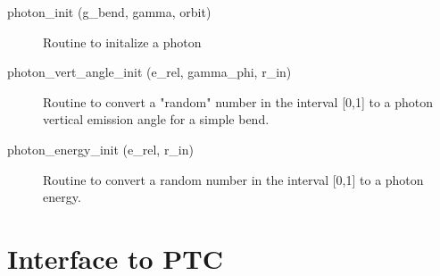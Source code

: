 \begin{description}

\label{r:photon.init}
\item[photon_init (g_bend, gamma, orbit)] \Newline 
Routine to initalize a photon

\label{r:photon.vert.angle.init}
\item[photon_vert_angle_init (e_rel, gamma_phi, r_in)] \Newline 
Routine to convert a "random" number in the interval [0,1] to a photon vertical emission 
angle for a simple bend.

\label{r:photon.energy.init}
\item[photon_energy_init (e_rel, r_in)] \Newline 
Routine to convert a random number in the interval [0,1] to a photon energy.

\end{description}

\section{Interface to PTC}
\label{r:ptc}      

